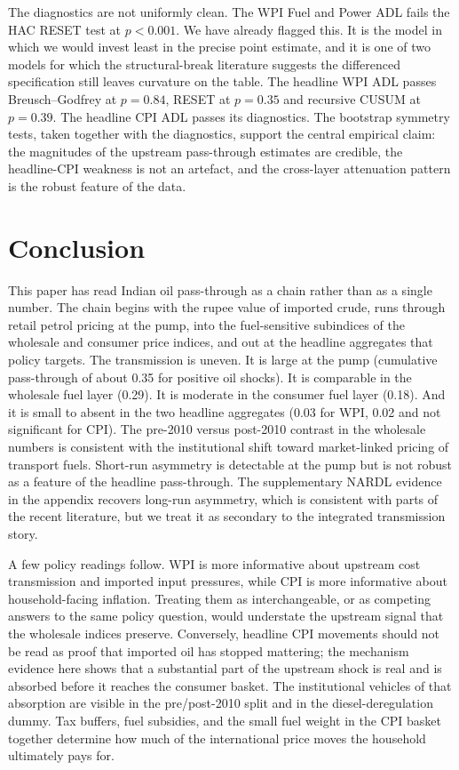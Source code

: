 \documentclass[11pt,a4paper]{article}
\begin{document}
The diagnostics are not uniformly clean. The WPI Fuel and Power ADL fails the HAC RESET test at $p < 0.001$. We have already flagged this. It is the model in which we would invest least in the precise point estimate, and it is one of two models for which the structural-break literature suggests the differenced specification still leaves curvature on the table. The headline WPI ADL passes Breusch--Godfrey at $p = 0.84$, RESET at $p = 0.35$ and recursive CUSUM at $p = 0.39$. The headline CPI ADL passes its diagnostics. The bootstrap symmetry tests, taken together with the diagnostics, support the central empirical claim: the magnitudes of the upstream pass-through estimates are credible, the headline-CPI weakness is not an artefact, and the cross-layer attenuation pattern is the robust feature of the data.

\section{Conclusion}
\label{sec:conc}

This paper has read Indian oil pass-through as a chain rather than as a single number. The chain begins with the rupee value of imported crude, runs through retail petrol pricing at the pump, into the fuel-sensitive subindices of the wholesale and consumer price indices, and out at the headline aggregates that policy targets. The transmission is uneven. It is large at the pump (cumulative pass-through of about 0.35 for positive oil shocks). It is comparable in the wholesale fuel layer (0.29). It is moderate in the consumer fuel layer (0.18). And it is small to absent in the two headline aggregates (0.03 for WPI, 0.02 and not significant for CPI). The pre-2010 versus post-2010 contrast in the wholesale numbers is consistent with the institutional shift toward market-linked pricing of transport fuels. Short-run asymmetry is detectable at the pump but is not robust as a feature of the headline pass-through. The supplementary NARDL evidence in the appendix recovers long-run asymmetry, which is consistent with parts of the recent literature, but we treat it as secondary to the integrated transmission story.

A few policy readings follow. WPI is more informative about upstream cost transmission and imported input pressures, while CPI is more informative about household-facing inflation. Treating them as interchangeable, or as competing answers to the same policy question, would understate the upstream signal that the wholesale indices preserve. Conversely, headline CPI movements should not be read as proof that imported oil has stopped mattering; the mechanism evidence here shows that a substantial part of the upstream shock is real and is absorbed before it reaches the consumer basket. The institutional vehicles of that absorption are visible in the pre/post-2010 split and in the diesel-deregulation dummy. Tax buffers, fuel subsidies, and the small fuel weight in the CPI basket together determine how much of the international price moves the household ultimately pays for.
\end{document}
